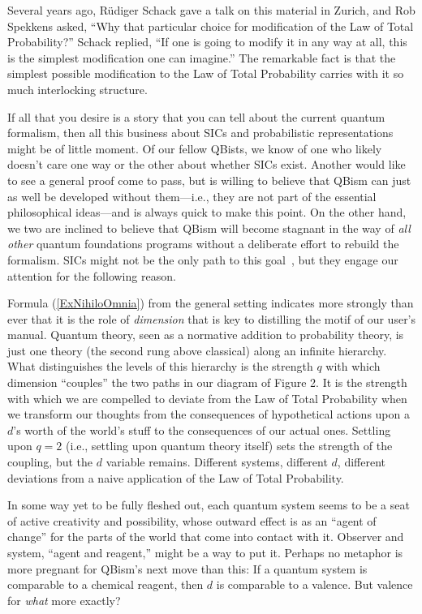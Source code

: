 \documentclass[aps,pra,superscriptaddress,10pt,tightenlines,twocolumn,nofootinbib]{revtex4}
\begin{document}
Several years ago, R\"udiger Schack gave a talk on this material in Zurich, and Rob Spekkens asked, ``Why that particular choice for modification of the Law of Total Probability?''  Schack replied, ``If one is going to modify it in any way at all, this is the simplest modification one can imagine.''  The remarkable fact is that the simplest possible modification to the Law of Total Probability carries with it so much interlocking structure.

If all that you desire is a story that you can tell about the current quantum formalism, then all this business about SICs and probabilistic representations might be of little moment.  Of our fellow QBists, we know of one who likely doesn't care one way or the other about whether SICs exist.  Another would like to see a general proof come to pass, but is willing to believe that QBism can just as well be developed without them---i.e., they are not part of the essential philosophical ideas---and is always quick to make this point.  On the other hand, we two are inclined to believe that QBism will become stagnant in the way of {\it all other\/} quantum foundations programs without a deliberate effort to rebuild the formalism.  SICs might not be the only path to this goal~\cite{FQXi}, but they engage our attention for the following reason.

Formula (\ref{ExNihiloOmnia}) from the general setting indicates more strongly than ever that it is the role of {\it dimension\/} that is key to distilling the motif of our user's manual.  Quantum theory, seen as a normative addition to probability theory, is just one theory (the second rung above classical) along an infinite hierarchy.  What distinguishes the levels of this hierarchy is the strength $q$ with which dimension ``couples'' the two paths in our diagram of Figure 2.  It is the strength with which we are compelled to deviate from the Law of Total Probability when we transform our thoughts from the consequences of hypothetical actions upon a $d$'s worth of the world's stuff to the consequences of our actual ones.  Settling upon $q=2$ (i.e., settling upon quantum theory itself) sets the strength of the coupling, but the $d$ variable remains.  Different systems, different $d$, different deviations from a naive application of the Law of Total Probability.

In some way yet to be fully fleshed out, each quantum system seems to be a seat of active creativity and possibility, whose outward effect is as an ``agent of change'' for the parts of the world that come into contact with it.  Observer and system, ``agent and reagent,'' might be a way to put it.  Perhaps no metaphor is more pregnant for QBism's next move than this:  If a quantum system is comparable to a chemical reagent, then $d$ is comparable to a valence.  But valence for {\it what\/} more exactly?
\end{document}
